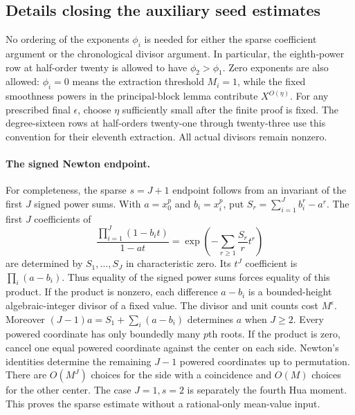 \documentclass[11pt,reqno]{amsart}
\numberwithin{equation}{section}
\theoremstyle{definition}
\begin{document}
\subsection{Details closing the auxiliary seed estimates}
\label{sec:seed-details}

No ordering of the exponents $\phi_i$ is needed for either the sparse
coefficient argument or the chronological divisor argument.  In particular,
the eighth-power row at half-order twenty is allowed to have
$\phi_2>\phi_1$.  Zero exponents are also allowed: $\phi_i=0$ means the
extraction threshold $M_i=1$, while the fixed smoothness powers in the
principal-block lemma contribute $X^{O(\eta)}$.  For any prescribed final
$\epsilon$, choose $\eta$ sufficiently small after the finite proof is fixed.
The degree-sixteen rows at half-orders twenty-one through twenty-three use
this convention for their eleventh extraction.  All actual divisors remain
nonzero.

\paragraph{The signed Newton endpoint.}
For completeness, the sparse $s=J+1$ endpoint follows from an invariant
of the first $J$ signed power sums.  With $a=x_0^p$ and $b_i=x_i^p$, put
$S_r=\sum_{i=1}^Jb_i^r-a^r$.  The first $J$ coefficients of
\[
 \frac{\prod_{i=1}^J(1-b_it)}{1-at}
     =\exp\left(-\sum_{r\ge1}\frac{S_r}{r}t^r\right)
\]
are determined by $S_1,\ldots,S_J$ in characteristic zero.  Its $t^J$
coefficient is $\prod_i(a-b_i)$.  Thus equality of the signed power sums
forces equality of this product.  If the product is nonzero, each difference
$a-b_i$ is a bounded-height algebraic-integer divisor of a fixed value.
The divisor and unit counts cost $M^\epsilon$.  Moreover
$(J-1)a=S_1+\sum_i(a-b_i)$ determines $a$ when $J\ge2$.
Every powered coordinate has only boundedly many $p$th roots.
If the product is zero, cancel one equal powered coordinate against the
center on each side.  Newton's identities determine the remaining $J-1$
powered coordinates up to permutation.  There are $O(M^J)$ choices for the
side with a coincidence and $O(M)$ choices for the other center.
The case $J=1,s=2$ is separately the fourth Hua moment.  This proves the
sparse estimate without a rational-only mean-value input.
\end{document}
